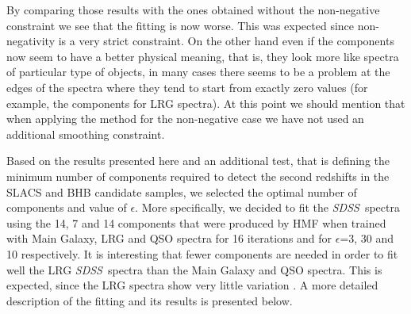 \documentclass[12pt,preprint]{aastex}
\newcommand{\project}[1]{\textsl{#1}}
\newcommand{\sdss}{\project{SDSS}}
\newcommand{\SDSS}{\sdss}
\begin{document}
By comparing those results with the ones obtained without the
non-negative constraint we see that the fitting is now worse. This was
expected since non-negativity is a very strict constraint. On the
other hand even if the components now seem to have a better physical
meaning, that is, they look more like spectra of particular type of
objects, in many cases there seems to be a problem at the edges of the
spectra where they tend to start from exactly zero values (for
example, the components for LRG spectra). At this point we should
mention that when applying the method for the non-negative case we
have not used an additional smoothing constraint.

Based on the results presented here and an additional test, that is 
defining the minimum number of components required to detect the 
second redshifts in the SLACS and BHB candidate samples, we selected 
the optimal number of components and value of $\epsilon$. More specifically, 
we decided to fit the \SDSS\ spectra using the 14, 7 and 14 components 
that were produced by HMF when trained with Main Galaxy, LRG
and QSO spectra for 16 iterations and for $\epsilon$=3, 30 and 10
respectively. It is interesting that fewer components are needed in
order to fit well the LRG \SDSS\ spectra than the Main
Galaxy and QSO spectra.  This is expected, since the LRG spectra show
very little variation \citep{eishogg}. A more detailed description of
the fitting and its results is presented below.
\end{document}
